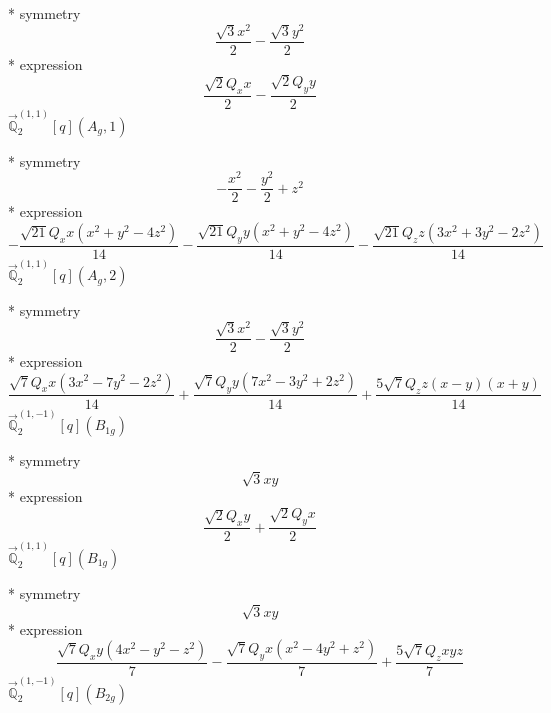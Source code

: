 \documentclass[fleqn,8pt]{jsarticle}
\begin{document}
\noindent\quad ** symmetry
\begin{dmath*}
\frac{\sqrt{3} x^{2}}{2} - \frac{\sqrt{3} y^{2}}{2}
\end{dmath*}
\noindent\quad ** expression
\begin{dmath*}
\frac{\sqrt{2} Q_{x} x}{2} - \frac{\sqrt{2} Q_{y} y}{2}
\end{dmath*}
\noindent\quad $\vec{\mathbb{Q}}_{2}^{(1,1)}[q](A_{g},1)$

\noindent\quad ** symmetry
\begin{dmath*}
- \frac{x^{2}}{2} - \frac{y^{2}}{2} + z^{2}
\end{dmath*}
\noindent\quad ** expression
\begin{dmath*}
- \frac{\sqrt{21} Q_{x} x \left(x^{2} + y^{2} - 4 z^{2}\right)}{14} - \frac{\sqrt{21} Q_{y} y \left(x^{2} + y^{2} - 4 z^{2}\right)}{14} - \frac{\sqrt{21} Q_{z} z \left(3 x^{2} + 3 y^{2} - 2 z^{2}\right)}{14}
\end{dmath*}
\noindent\quad $\vec{\mathbb{Q}}_{2}^{(1,1)}[q](A_{g},2)$

\noindent\quad ** symmetry
\begin{dmath*}
\frac{\sqrt{3} x^{2}}{2} - \frac{\sqrt{3} y^{2}}{2}
\end{dmath*}
\noindent\quad ** expression
\begin{dmath*}
\frac{\sqrt{7} Q_{x} x \left(3 x^{2} - 7 y^{2} - 2 z^{2}\right)}{14} + \frac{\sqrt{7} Q_{y} y \left(7 x^{2} - 3 y^{2} + 2 z^{2}\right)}{14} + \frac{5 \sqrt{7} Q_{z} z \left(x - y\right) \left(x + y\right)}{14}
\end{dmath*}
\noindent\quad $\vec{\mathbb{Q}}_{2}^{(1,-1)}[q](B_{1g})$

\noindent\quad ** symmetry
\begin{dmath*}
\sqrt{3} x y
\end{dmath*}
\noindent\quad ** expression
\begin{dmath*}
\frac{\sqrt{2} Q_{x} y}{2} + \frac{\sqrt{2} Q_{y} x}{2}
\end{dmath*}
\noindent\quad $\vec{\mathbb{Q}}_{2}^{(1,1)}[q](B_{1g})$

\noindent\quad ** symmetry
\begin{dmath*}
\sqrt{3} x y
\end{dmath*}
\noindent\quad ** expression
\begin{dmath*}
\frac{\sqrt{7} Q_{x} y \left(4 x^{2} - y^{2} - z^{2}\right)}{7} - \frac{\sqrt{7} Q_{y} x \left(x^{2} - 4 y^{2} + z^{2}\right)}{7} + \frac{5 \sqrt{7} Q_{z} x y z}{7}
\end{dmath*}
\noindent\quad $\vec{\mathbb{Q}}_{2}^{(1,-1)}[q](B_{2g})$
\end{document}
